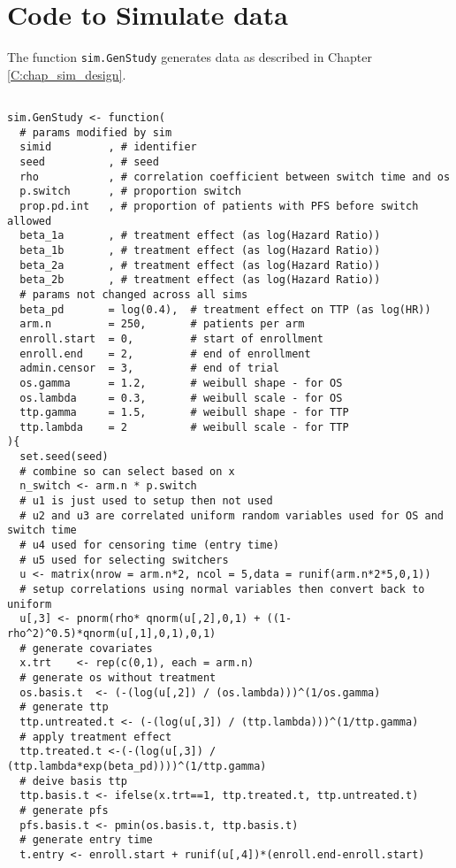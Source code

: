 \section{Code to Simulate data}
\label{S:app_R:simgen}
The function \verb+sim.GenStudy+ generates data as described in Chapter \ref{C:chap_sim_design}.

\begin{Verbatim}[fontsize=\small, baselinestretch=0.75]

sim.GenStudy <- function(
  # params modified by sim 
  simid         , # identifier
  seed          , # seed
  rho           , # correlation coefficient between switch time and os
  p.switch      , # proportion switch 
  prop.pd.int   , # proportion of patients with PFS before switch allowed
  beta_1a       , # treatment effect (as log(Hazard Ratio))
  beta_1b       , # treatment effect (as log(Hazard Ratio))
  beta_2a       , # treatment effect (as log(Hazard Ratio))
  beta_2b       , # treatment effect (as log(Hazard Ratio))
  # params not changed across all sims
  beta_pd       = log(0.4),  # treatment effect on TTP (as log(HR))  
  arm.n         = 250,       # patients per arm
  enroll.start  = 0,         # start of enrollment
  enroll.end    = 2,         # end of enrollment
  admin.censor  = 3,         # end of trial
  os.gamma      = 1.2,       # weibull shape - for OS
  os.lambda     = 0.3,       # weibull scale - for OS
  ttp.gamma     = 1.5,       # weibull shape - for TTP
  ttp.lambda    = 2          # weibull scale - for TTP
){
  set.seed(seed)  
  # combine so can select based on x 
  n_switch <- arm.n * p.switch  
  # u1 is just used to setup then not used
  # u2 and u3 are correlated uniform random variables used for OS and switch time
  # u4 used for censoring time (entry time)
  # u5 used for selecting switchers
  u <- matrix(nrow = arm.n*2, ncol = 5,data = runif(arm.n*2*5,0,1))
  # setup correlations using normal variables then convert back to uniform
  u[,3] <- pnorm(rho* qnorm(u[,2],0,1) + ((1-rho^2)^0.5)*qnorm(u[,1],0,1),0,1)  
  # generate covariates
  x.trt    <- rep(c(0,1), each = arm.n)  
  # generate os without treatment
  os.basis.t  <- (-(log(u[,2]) / (os.lambda)))^(1/os.gamma)  
  # generate ttp 
  ttp.untreated.t <- (-(log(u[,3]) / (ttp.lambda)))^(1/ttp.gamma)  
  # apply treatment effect
  ttp.treated.t <-(-(log(u[,3]) / (ttp.lambda*exp(beta_pd))))^(1/ttp.gamma)  
  # deive basis ttp
  ttp.basis.t <- ifelse(x.trt==1, ttp.treated.t, ttp.untreated.t)
  # generate pfs
  pfs.basis.t <- pmin(os.basis.t, ttp.basis.t)
  # generate entry time
  t.entry <- enroll.start + runif(u[,4])*(enroll.end-enroll.start)

\end{Verbatim}
